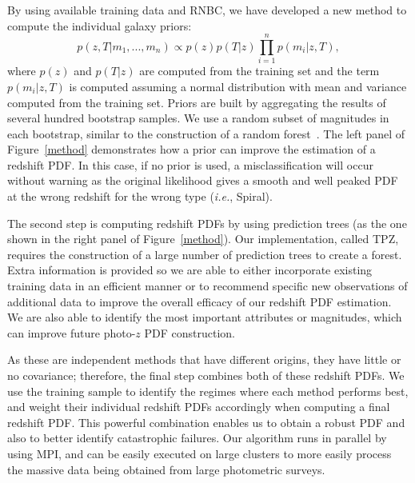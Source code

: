 By using available training data and RNBC, we have developed a new method to compute the individual galaxy priors:
\begin{equation}\label{prior}
 p(z,T|m_1,...,m_n) \propto p(z)p(T|z)\prod_{i=1}^{n} p(m_i|z,T),
\end{equation}
where $p(z)$ and $p(T|z)$ are computed from the training set and the term $p(m_i|z,T)$ is computed assuming a normal distribution with mean and variance computed from the training set. Priors are built by aggregating the results of several hundred bootstrap samples. We use a random subset of magnitudes in each bootstrap, similar to the construction of a random forest~\citep{Breiman2001}. The left panel of Figure~\ref{method}  demonstrates how a prior can improve the estimation of a redshift PDF. In this case, if no prior is used, a misclassification will occur without warning as the original likelihood gives a smooth and well peaked PDF at the wrong redshift for the wrong type (\textit{i.e.}, Spiral).

The second step is computing redshift PDFs by using prediction trees (as the one shown in the right panel of Figure~\ref{method}). Our implementation, called TPZ, requires the construction of a large number of prediction trees to create a forest. Extra information is provided so we are able to either incorporate existing training data in an efficient manner or to recommend specific new observations of additional data to improve the overall efficacy of our redshift PDF estimation. We are also able to identify the most important attributes or magnitudes, which can improve future photo-$z$ PDF construction.


As these are independent methods that have different origins, they have little or no covariance; therefore, the final step combines both of these redshift PDFs. We use the training sample to identify the regimes where each method performs best, and weight their individual redshift PDFs accordingly when computing a final redshift PDF. This powerful combination enables us to obtain a robust PDF and also to better identify catastrophic failures. Our algorithm runs in parallel by using MPI, and can be easily executed on large clusters to more easily process the massive data being obtained from large photometric surveys.

